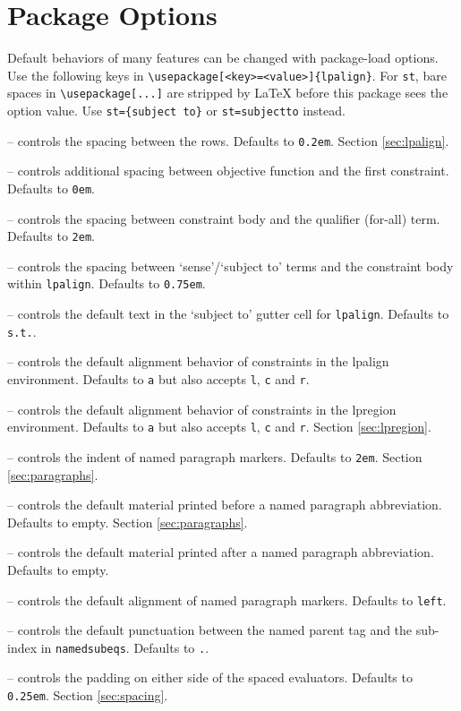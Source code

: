 \documentclass{article}
\begin{document}
\section{Package Options}\label{sec:options}
Default behaviors of many features can be changed with package-load options. Use the following keys in \verb|\usepackage[<key>=<value>]{lpalign}|.
For \verb|st|, bare spaces in \verb|\usepackage[...]| are stripped by LaTeX before this package sees the option value. Use \verb|st={subject to}| or \verb|st=subject|\texttt{\raisebox{-0.6ex}{\textasciitilde}}\verb|to| instead.
		\begin{compactitem}
		\item[\Verb|row-sep|] -- controls the spacing between the rows. Defaults to \verb|0.2em|. Section \ref{sec:lpalign}.
		\item[\Verb|objective-sep|] -- controls additional spacing between objective function and the first constraint. Defaults to \verb|0em|. 
		\item[\Verb|qualifier-sep|] -- controls the spacing between constraint body and the qualifier (for-all) term. Defaults to \verb|2em|. 
		\item[\Verb|gutter-sep|] -- controls the spacing between `sense'/`subject to' terms and the constraint body within \verb|lpalign|. Defaults to \verb|0.75em|. 
		\item[\Verb|st|] -- controls the default text in the `subject to' gutter cell for \verb|lpalign|. Defaults to \verb|s.t.|. 
		\item[\Verb|flush|] -- controls the default alignment behavior of constraints in the \textsf{lpalign} environment. Defaults to \verb|a| but also accepts \verb|l|, \verb|c| and \verb|r|.
		\item[\Verb|region-flush|] -- controls the default alignment behavior of constraints in the \textsf{lpregion} environment. Defaults to \verb|a| but also accepts \verb|l|, \verb|c| and \verb|r|. Section \ref{sec:lpregion}.
		\item[\Verb|namedpara-indent|] -- controls the indent of named paragraph markers. Defaults to \verb|2em|. Section \ref{sec:paragraphs}.
		\item[\Verb|namedpara-before|] -- controls the default material printed before a named paragraph abbreviation. Defaults to empty. Section \ref{sec:paragraphs}.
		\item[\Verb|namedpara-after|] -- controls the default material printed after a named paragraph abbreviation. Defaults to empty.
		\item[\Verb|namedpara-flush|] -- controls the default alignment of named paragraph markers. Defaults to \verb|left|. 
		\item[\Verb|namedsubeqs-punct|] -- controls the default punctuation between the named parent tag and the sub-index in \verb|namedsubeqs|. Defaults to \verb|.|. 
		\item[\Verb|evaluator-spacing|] -- controls the padding on either side of the spaced evaluators. Defaults to \verb|0.25em|. Section \ref{sec:spacing}.
		\end{compactitem}
\end{document}
